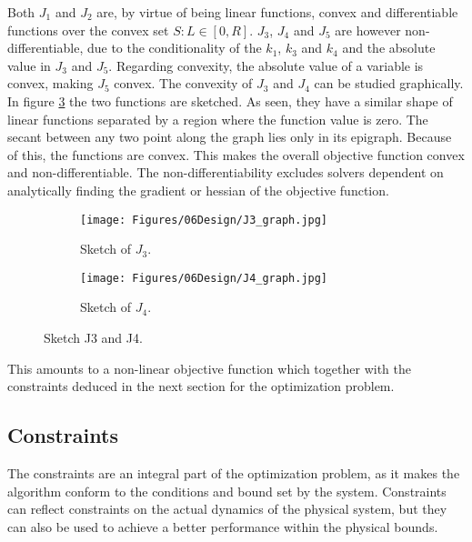 Both $J_1$ and $J_2$ are, by virtue of being linear functions, convex and differentiable functions over the convex set $\mathit{S}: L\in [0,R]$. $J_3$, $J_4$ and $J_5$ are however non-differentiable, due to the conditionality of the $k_1$, $k_3$ and $k_4$ and the absolute value in $J_3$ and $J_5$. Regarding convexity, the absolute value of a variable is convex, making $J_5$ convex. The  convexity of $J_3$ and $J_4$ can be studied graphically. In figure \ref{fig:sketchJ3&J4} the two functions are sketched. As seen, they have a similar shape of linear functions separated by a region where the function value is zero. The secant between any two point along the graph lies only in its epigraph. Because of this, the functions are convex. This makes the overall objective function convex and non-differentiable. The non-differentiability excludes solvers dependent on analytically finding the gradient or hessian of the objective function. 

\begin{figure}
    \begin{subfigure}{\textwidth}
    \centering
    \texttt{[image: Figures/06Design/J3\_graph.jpg]}
    \caption{Sketch of $J_3$.}
    \label{fig:J3_graph}
  \end{subfigure}

  \vspace{0.5cm}

  \begin{subfigure}{\textwidth}
    \centering
    \texttt{[image: Figures/06Design/J4\_graph.jpg]}
    \caption{Sketch of $J_4$.}
    \label{fig:J4_graph}
  \end{subfigure}

  \caption[Sketch J3 and J4]{Sketch J3 and J4.}
  \label{fig:sketchJ3&J4}
\end{figure}

This amounts to a non-linear objective function which together with the constraints deduced in the next section for the optimization problem.

\subsection{Constraints}

The constraints are an integral part of the optimization problem, as it makes the algorithm conform to the conditions and bound set by the system. Constraints can reflect constraints on the actual dynamics of the physical system, but they can also be used to achieve a better performance within the physical bounds.\\

